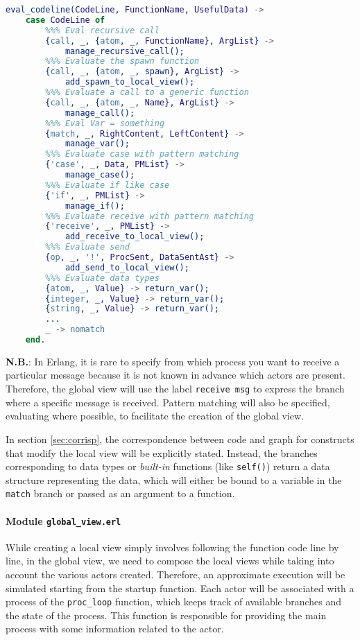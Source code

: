 \begin{lstlisting}[language=Erlang, caption=Pseudocode of \texttt{eval\_codeline} function, label=code:eval]
eval_codeline(CodeLine, FunctionName, UsefulData) ->
    case CodeLine of
        %%% Eval recursive call
        {call, _, {atom, _, FunctionName}, ArgList} ->
            manage_recursive_call();
        %%% Evaluate the spawn function
        {call, _, {atom, _, spawn}, ArgList} ->
            add_spawn_to_local_view();
        %%% Evaluate a call to a generic function
        {call, _, {atom, _, Name}, ArgList} ->
            manage_call();
        %%% Eval Var = something
        {match, _, RightContent, LeftContent} ->
            manage_var();
        %%% Evaluate case with pattern matching
        {'case', _, Data, PMList} ->
            manage_case();
        %%% Evaluate if like case
        {'if', _, PMList} ->
            manage_if();
        %%% Evaluate receive with pattern matching
        {'receive', _, PMList} ->
            add_receive_to_local_view();
        %%% Evaluate send
        {op, _, '!', ProcSent, DataSentAst} ->
            add_send_to_local_view();
        %%% Evaluate data types
        {atom, _, Value} -> return_var();
        {integer, _, Value} -> return_var();
        {string, _, Value} -> return_var();
        ...
        _ -> nomatch
    end.
\end{lstlisting}

\textbf{N.B.}: In Erlang, it is rare to specify from which process you want to receive a particular message because it is not known in advance which actors are present. Therefore, the global view will use the label \texttt{receive msg} to express the branch where a specific message is received. Pattern matching will also be specified, evaluating where possible, to facilitate the creation of the global view.

In section \ref{sec:corrisp}, the correspondence between code and graph for constructs that modify the local view will be explicitly stated. Instead, the branches corresponding to data types or \textit{built-in} functions (like \texttt{self()}) return a data structure representing the data, which will either be bound to a variable in the \texttt{match} branch or passed as an argument to a function.

\paragraph{Module \texttt{global\_view.erl}}

While creating a local view simply involves following the function code line by line, in the global view, we need to compose the local views while taking into account the various actors created. Therefore, an approximate execution will be simulated starting from the startup function. Each actor will be associated with a process of the \texttt{proc\_loop} function, which keeps track of available branches and the state of the process. This function is responsible for providing the main process with some information related to the actor.

